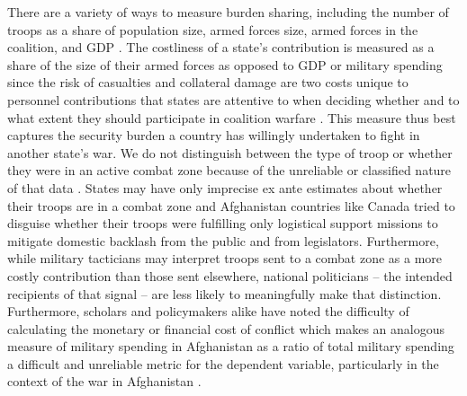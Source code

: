 \documentclass[12pt,letterpaper]{article}
\begin{document}
		There are a variety of ways to measure burden sharing, including the number of troops as a share of population size, armed forces size, armed forces in the coalition, and GDP \citep[668-669]{hartley_natoburdensharingfuture_1999}. The costliness of a state's contribution is measured as a share of the size of their armed forces as opposed to GDP or military spending since the risk of casualties and collateral damage are two costs unique to personnel contributions that states are attentive to when deciding whether and to what extent they should participate in coalition warfare \citep{ringsmose_natoburdensharingredux_2010, chivvis_topplingqaddafilibya_2014, vonhlatky_cashcombatamerica_2015, haesebrouck_natoburdensharing_2017}. This measure thus best captures the security burden a country has willingly undertaken to fight in another state's war. We do not distinguish between the type of troop or whether they were in an active combat zone because of the unreliable or classified nature of that data \citep[44-45]{bogers_missionafghanistanwho_2013}. States may have only imprecise ex ante estimates about whether their troops are in a combat zone and Afghanistan countries like Canada tried to disguise whether their troops were fulfilling only logistical support missions to mitigate domestic backlash from the public and from legislators. Furthermore, while military tacticians may interpret troops sent to a combat zone as a more costly contribution than those sent elsewhere, national politicians -- the intended recipients of that signal -- are less likely to meaningfully make that distinction. Furthermore, scholars and policymakers alike have noted the difficulty of calculating the monetary or financial cost of conflict \citep{stiglitz_estimatingcostswar_2012} which makes an analogous measure of military spending in Afghanistan as a ratio of total military spending a difficult and unreliable metric for the dependent variable, particularly in the context of the war in Afghanistan \citep{bruck_economiccostsgerman_2011}.
\end{document}
